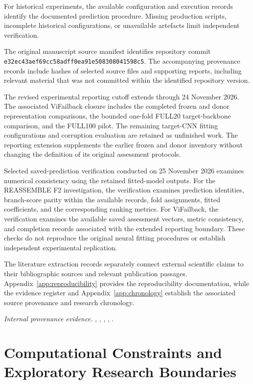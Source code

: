 For historical experiments, the available configuration and execution records identify the documented prediction procedure. Missing production scripts, incomplete historical configurations, or unavailable artefacts limit independent verification.

The original manuscript source manifest identifies repository commit \texttt{e32ec43aef69cc58adff0ea91e508308041598c5}. The accompanying provenance records include hashes of selected source files and supporting reports, including relevant material that was not committed within the identified repository version.

The revised experimental reporting cutoff extends through 24 November 2026. The associated ViFailback closure includes the completed frozen and donor representation comparisons, the bounded one-fold FULL20 target-backbone comparison, and the FULL100 pilot. The remaining target-CNN fitting configurations and corruption evaluation are retained as unfinished work. The reporting extension supplements the earlier frozen and donor inventory without changing the definition of its original assessment protocols.

Selected saved-prediction verification conducted on 25 November 2026 examines numerical consistency using the retained fitted-model outputs. For the REASSEMBLE F2 investigation, the verification examines prediction identities, branch-score parity within the available records, fold assignments, fitted coefficients, and the corresponding ranking metrics. For ViFailback, the verification examines the available saved assessment vectors, metric consistency, and completion records associated with the extended reporting boundary. These checks do not reproduce the original neural fitting procedures or establish independent experimental replication.

The literature extraction records separately connect external scientific claims to their bibliographic sources and relevant publication passages. Appendix~\ref{app:reproducibility} provides the reproducibility documentation, while the evidence register and Appendix~\ref{app:chronology} establish the associated source provenance and research chronology.

\noindent\textit{Internal provenance evidence.} , , , , .

\section{Computational Constraints and Exploratory Research Boundaries}
\label{sec:ch4-boundaries}

